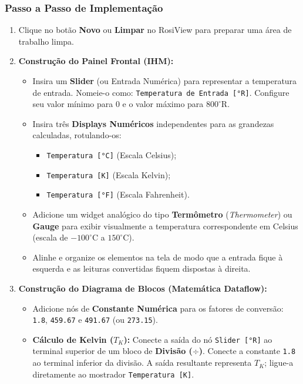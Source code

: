 \documentclass[11pt,a4paper]{article}
\begin{document}
\subsubsection{Passo a Passo de Implementação}
\begin{enumerate}
    \item Clique no botão \textbf{Novo} ou \textbf{Limpar} no RosiView para preparar uma área de trabalho limpa.
    \item \textbf{Construção do Painel Frontal (IHM):}
    \begin{itemize}
        \item Insira um \textbf{Slider} (ou Entrada Numérica) para representar a temperatura de entrada. Nomeie-o como: \texttt{Temperatura de Entrada [°R]}. Configure seu valor mínimo para $0$ e o valor máximo para $800^\circ\text{R}$.
        \item Insira três \textbf{Displays Numéricos} independentes para as grandezas calculadas, rotulando-os:
        \begin{itemize}
            \item \texttt{Temperatura [°C]} (Escala Celsius);
            \item \texttt{Temperatura [K]} (Escala Kelvin);
            \item \texttt{Temperatura [°F]} (Escala Fahrenheit).
        \end{itemize}
        \item Adicione um widget analógico do tipo \textbf{Termômetro} (\textit{Thermometer}) ou \textbf{Gauge} para exibir visualmente a temperatura correspondente em Celsius (escala de $-100^\circ\text{C}$ a $150^\circ\text{C}$).
        \item Alinhe e organize os elementos na tela de modo que a entrada fique à esquerda e as leituras convertidas fiquem dispostas à direita.
    \end{itemize}
    \item \textbf{Construção do Diagrama de Blocos (Matemática Dataflow):}
    \begin{itemize}
        \item Adicione nós de \textbf{Constante Numérica} para os fatores de conversão: \texttt{1.8}, \texttt{459.67} e \texttt{491.67} (ou \texttt{273.15}).
        \item \textbf{Cálculo de Kelvin ($T_K$):} Conecte a saída do nó \texttt{Slider [°R]} ao terminal superior de um bloco de \textbf{Divisão ($\div$)}. Conecte a constante \texttt{1.8} ao terminal inferior da divisão. A saída resultante representa $T_K$; ligue-a diretamente ao mostrador \texttt{Temperatura [K]}.

\end{itemize}
\end{enumerate}
\end{document}

